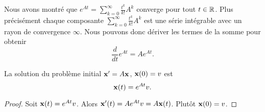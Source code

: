   Nous avons montré que $e^{At} = \sum_{k=0}^\infty \frac{t^k}{k!} A^k$ converge pour tout $t \in \mathbb{R}$. Plus précisément chaque composante $\sum_{k=0}^\infty \frac{t^k}{k!} A^k$ est une série intégrable avec un rayon de convergence $\infty$.
Nous pouvons donc dériver les termes de la somme pour obtenir 
\begin{equation}
  \label{eq:24}
  \frac{d}{dt} e^{At} = A e^{At}. 
\end{equation}


\begin{theorem}
  \label{thr:31}
  La solution du problème initial $\mathbf{x}' = A\mathbf{x}$, $\mathbf{x}(0) =v$ est 
  \begin{displaymath}
    \mathbf{x}(t) = e^{At} v.
  \end{displaymath}
\end{theorem}

\begin{proof}
  Soit $\mathbf{x}(t) = e^{At} v$. Alors $\mathbf{x}'(t) = A e^{At}v = A\mathbf{x}(t)$. Plutôt $\mathbf{x}(0) = v$. 
\end{proof}


